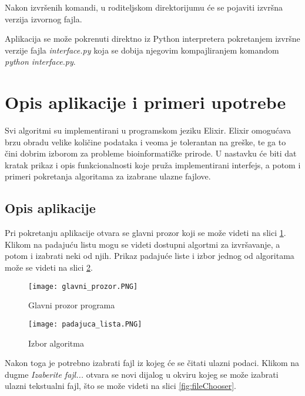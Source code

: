 \documentclass[12pt,oneside]{memoir}
\begin{document}
\noindent Nakon izvršenih komandi, u roditeljskom direktorijumu će se pojaviti izvršna verzija izvornog fajla.



Aplikacija se može pokrenuti direktno iz Python interpretera pokretanjem izvršne verzije fajla \textit{interface.py} koja se dobija njegovim kompajliranjem komandom \textit{python interface.py}.

\section{Opis aplikacije i primeri upotrebe}
\label{odeljak:OpisPrimeriUpotrebe}

Svi algoritmi su implementirani u programskom jeziku Elixir. Elixir omogućava brzu obradu velike količine podataka i veoma je tolerantan na greške, te ga to čini dobrim izborom za probleme bioinformatičke prirode. U nastavku će biti dat kratak prikaz i opis funkcionalnosti koje pruža implementirani interfejs, a potom i primeri pokretanja algoritama za izabrane ulazne fajlove.

\subsection{Opis aplikacije}

Pri pokretanju aplikacije otvara se glavni prozor koji se može videti na slici \ref{fig:glavniProzor}. Klikom na padajuću listu mogu se videti dostupni algortmi za izvršavanje, a potom i izabrati neki od njih. Prikaz padajuće liste i izbor jednog od algoritama može se videti na slici \ref{fig:padajucaLista}. 

\begin{figure}[h]
\centering
\texttt{[image: glavni\_prozor.PNG]}
\caption{Glavni prozor programa}
\label{fig:glavniProzor}
\end{figure}

\begin{figure}[h]
\centering
\texttt{[image: padajuca\_lista.PNG]}
\caption{Izbor algoritma}
\label{fig:padajucaLista}
\end{figure}

Nakon toga je potrebno izabrati fajl iz kojeg će se čitati ulazni podaci. Klikom na dugme \textit{Izaberite fajl...} otvara se novi dijalog u okviru kojeg se može izabrati ulazni tekstualni fajl, što se može videti na slici \ref{fig:fileChooser}.
\end{document}
